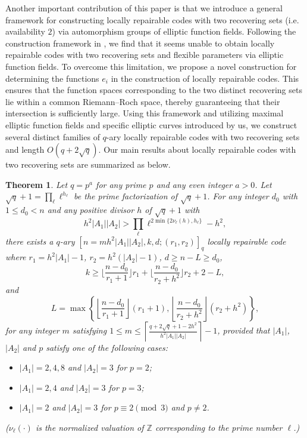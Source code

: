 \documentclass[journal,12pt,onecolumn]{IEEEtran}
\newtheorem{theorem}{Theorem}
\begin{document}
Another important contribution of this paper is that we introduce a general framework for constructing locally repairable codes with two recovering sets (i.e. availability \(2\)) via automorphism groups of elliptic function fields. Following the construction framework in \cite{MA2023105686}, we find that it seems unable to obtain locally repairable codes with two recovering sets and flexible parameters via elliptic function fields. To overcome this limitation, we propose a novel construction for determining the functions \(e_i\) in the construction of locally repairable codes. This ensures that the function spaces corresponding to the two distinct recovering sets lie within a common Riemann–Roch space, thereby guaranteeing that their intersection is sufficiently large. Using this framework and utilizing maximal elliptic function fields and specific elliptic curves introduced by us, we construct several distinct families of \(q\)-ary locally repairable codes with two recovering sets and length \(O(q+2\sqrt{q})\). Our main results about locally repairable codes with two recovering sets are summarized as below.

\begin{theorem}\label{lrc_two_max}
    Let \( q = p^a \) for any prime \( p \) and any even integer \( a > 0 \). Let \(\sqrt{q}+1 = \prod_\ell \ell^{h_\ell}\)  be the prime factorization of \( \sqrt{q} + 1 \). For any integer \( d_0 \) with \( 1 \leq d_0 < n \) and any positive divisor \( h \) of \( \sqrt{q} + 1 \) with
    \begin{equation*}
        h^2|A_1||A_2|>\prod_\ell \ell^{2\min\{2\nu_\ell(h),h_\ell\}}-h^2,
    \end{equation*}
    there exists a \( q \)-ary \([n = mh^2|A_1||A_2|, k, d;(r_1,r_2)]_q\) locally repairable code where \( r_1 = h^2|A_1| - 1 \), \(r_2 = h^2(|A_2|-1)\), \(d \ge n - L \ge d_0\), 
    \[
        k \geq \bigg\lfloor\frac{n-d_0}{r_1 + 1}\bigg\rfloor r_1 + \bigg\lfloor\frac{n-d_0}{r_2 + h^2}\bigg\rfloor r_2  + 2 - L,
    \]
    and
    \[
        L = \max\left\{\left\lfloor\frac{n-d_0}{r_1 + 1}\right\rfloor (r_1+1),\left\lfloor\frac{n-d_0}{r_2 + h^2}\right\rfloor (r_2 + h^2)\right\}, 
    \]
    for any integer \( m \) satisfying \(1 \leq m \leq \left\lceil \frac{q+2\sqrt{q}+1-2h^2}{h^2|A_1||A_2|} \right\rceil - 1 \), provided that \(|A_1|\), \(|A_2|\) and \( p \) satisfy one of the following cases:
     
    \begin{itemize}
        \item[(i)] \(|A_1| = 2,4,8\) and \(|A_2| = 3\) for \( p = 2 \);  
        \item[(ii)] \(|A_1| = 2,4\) and \(|A_2| = 3\) for \( p = 3 \);  
        \item[(iii)] \(|A_1| = 2\) and \(|A_2| = 3\) for \( p \equiv 2 \pmod{3} \) and \( p \neq 2 \).
    \end{itemize}
    (\(\nu_\ell(\cdot)\) is the normalized valuation of \(\mathbb{Z}\) corresponding to the prime number \(\ell\).)
\end{theorem}
\end{document}
